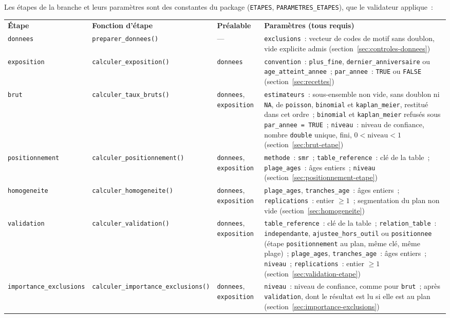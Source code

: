 \documentclass[a4paper,11pt]{article}
\newcommand{\code}[1]{\texttt{\small #1}}
\begin{document}
\medskip
{\sloppy{} Les étapes de la branche et leurs paramètres sont des constantes du package
(\code{ETAPES}, \code{PARAMETRES\_ETAPES}), que le validateur applique~:\par}

\begin{center}
\small
{}
\begin{tabular}{@{}p{2.6cm}p{5.95cm}p{1.9cm}p{3.95cm}@{}}
\rowcolor{tableheader}
\textcolor{financeblue}{\textbf{Étape}} &
\textcolor{financeblue}{\textbf{Fonction d'étape}} &
\textcolor{financeblue}{\textbf{Préalable}} &
\textcolor{financeblue}{\textbf{Paramètres (tous requis)}} \\
\code{donnees} & \code{preparer\_donnees()} & --- & \code{exclusions}~:
vecteur de codes de motif sans doublon, vide explicite admis
(section~\ref{sec:controles-donnees}) \\
\code{exposition} & \code{calculer\_exposition()} & \code{donnees} &
\code{convention}~: \code{plus\_fine}, \code{dernier\_anniversaire} ou
\code{age\_atteint\_annee}~; \code{par\_annee}~: \code{TRUE} ou \code{FALSE}
(section~\ref{sec:recettes}) \\
\code{brut} & \code{calculer\_taux\_bruts()} & \code{donnees},
\code{exposition} &
\code{estimateurs}~: sous-ensemble non vide, sans doublon ni \code{NA}, de
\code{poisson}, \code{binomial} et \code{kaplan\_meier}, restitué dans cet
ordre~; \code{binomial} et \code{kaplan\_meier} refusés sous
\code{par\_annee = TRUE}~; \code{niveau}~:
niveau de confiance, nombre \code{double} unique, fini,
$0 < \text{niveau} < 1$ (section~\ref{sec:brut-etape}) \\
\code{positionnement} & \code{calculer\_positionnement()} & \code{donnees},
\code{exposition} &
\code{methode}~: \code{smr}~; \code{table\_reference}~: clé de la
table~; \code{plage\_ages}~: âges entiers~; \code{niveau}
(section~\ref{sec:positionnement-etape}) \\
\code{homogeneite} & \code{calculer\_homogeneite()} & \code{donnees},
\code{exposition} &
\code{plage\_ages}, \code{tranches\_age}~: âges entiers~;
\code{replications}~: entier $\ge 1$~; segmentation du plan non vide
(section~\ref{sec:homogeneite}) \\
\code{validation} & \code{calculer\_validation()} & \code{donnees},
\code{exposition} &
\code{table\_reference}~: clé de la table~; \code{relation\_table}~:
\code{independante}, \code{ajustee\_hors\_outil} ou \code{positionnee}
(étape \code{positionnement} au plan, même clé, même plage)~;
\code{plage\_ages}, \code{tranches\_age}~: âges entiers~;
\code{niveau}~; \code{replications}~: entier $\ge 1$
(section~\ref{sec:validation-etape}) \\
\code{importance\_}\allowbreak\code{exclusions} & \code{calculer\_importance\_exclusions()} & \code{donnees},
\code{exposition} &
\code{niveau}~: niveau de confiance, comme pour \code{brut}~; après
\code{validation}, dont le résultat est lu si elle est au plan
(section~\ref{sec:importance-exclusions}) \\
\end{tabular}
\end{center}
\end{document}
